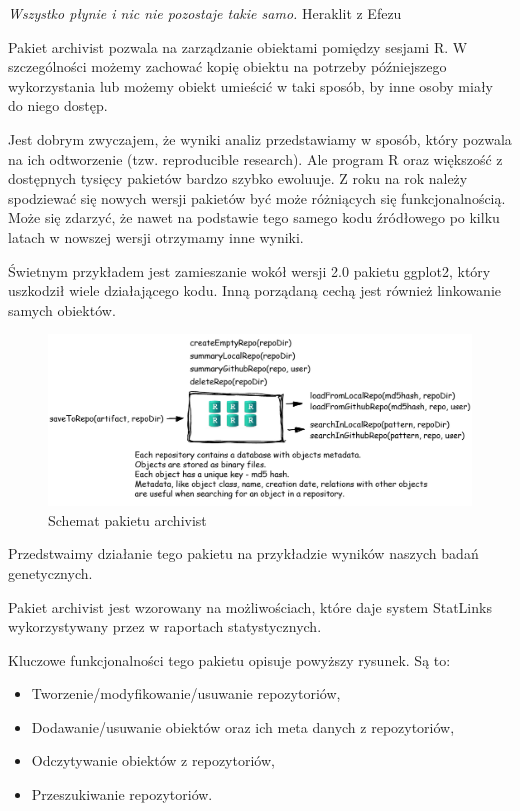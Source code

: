 \textit{Wszystko płynie i nic nie pozostaje takie samo.} Heraklit z
Efezu

Pakiet archivist pozwala na zarządzanie obiektami pomiędzy sesjami R. W
szczególności możemy zachować kopię obiektu na potrzeby późniejszego
wykorzystania lub możemy obiekt umieścić w taki sposób, by inne osoby
miały do niego dostęp.

Jest dobrym zwyczajem, że wyniki analiz przedstawiamy w sposób, który
pozwala na ich odtworzenie (tzw. reproducible research). Ale program R
oraz większość z dostępnych tysięcy pakietów bardzo szybko ewoluuje. Z
roku na rok należy spodziewać się nowych wersji pakietów być może
różniących się funkcjonalnością. Może się zdarzyć, że nawet na podstawie
tego samego kodu źródłowego po kilku latach w nowszej wersji otrzymamy
inne wyniki.

Świetnym przykładem jest zamieszanie wokół wersji 2.0 pakietu ggplot2,
który uszkodził wiele działającego kodu. Inną porządaną cechą jest
również linkowanie samych obiektów.

\begin{figure}
  \centering
  \includegraphics[width=\textwidth]{schemat.png}
  \caption{Schemat pakietu archivist}
\end{figure}

Przedstwaimy działanie tego pakietu na przykładzie wyników naszych badań
genetycznych.

Pakiet archivist jest wzorowany na możliwościach, które daje system
StatLinks wykorzystywany przez w raportach statystycznych.

Kluczowe funkcjonalności tego pakietu opisuje powyższy rysunek. Są to:

\begin{itemize}
\itemsep1pt\parskip0pt
\item
  Tworzenie/modyfikowanie/usuwanie repozytoriów,
\item
  Dodawanie/usuwanie obiektów oraz ich meta danych z repozytoriów,
\item
  Odczytywanie obiektów z repozytoriów,
\item
  Przeszukiwanie repozytoriów.
\end{itemize}

